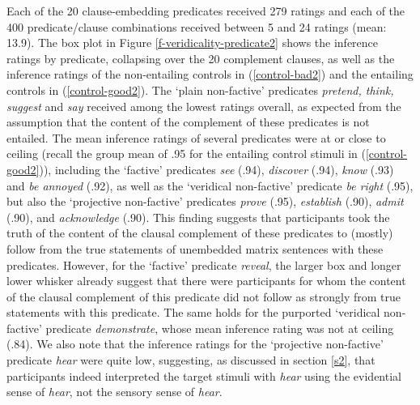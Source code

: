\documentclass[11pt,fleqn]{article}
\newcommand{\6}{\mbox{$[\hspace*{-.6mm}[$}}
\newcommand{\9}{\mbox{$]\hspace*{-.6mm}]$}}
\begin{document}
Each of the 20 clause-embedding predicates received 279 ratings and each of the 400 predicate/clause combinations received between 5 and 24 ratings (mean: 13.9). The box plot in Figure \ref{f-veridicality-predicate2} shows the inference ratings by predicate, collapsing over the 20 complement clauses, as well as the inference ratings of the non-entailing controls in (\ref{control-bad2}) and the entailing controls in (\ref{control-good2}). The `plain non-factive' predicates {\em pretend, think, suggest} and {\em say} received among the lowest ratings overall, as expected from the assumption that the content of the complement of these predicates is not entailed.  The mean inference ratings of several predicates were at or close to ceiling (recall the group mean of .95 for the entailing control stimuli in (\ref{control-good2})), including the `factive' predicates {\em see} (.94), {\em discover} (.94),  {\em know} (.93) and {\em be annoyed} (.92), as well as the `veridical non-factive' predicate {\em be right} (.95), but also the `projective non-factive' predicates {\em prove} (.95),  {\em establish} (.90), {\em admit} (.90), and {\em acknowledge} (.90). This finding suggests that participants took the truth of the content of the clausal complement of these predicates to (mostly) follow from the true statements of unembedded matrix sentences with these predicates. However, for the `factive' predicate {\em reveal}, the larger box and longer lower whisker already suggest that there were participants for whom the content of the clausal complement of this predicate did not follow as strongly from true statements with this predicate. The same holds for the purported `veridical non-factive' predicate {\em demonstrate}, whose mean inference rating was not at ceiling (.84). We also note that the inference ratings for the `projective non-factive' predicate {\em hear} were quite low, suggesting, as discussed in section \ref{s2}, that participants indeed interpreted the target stimuli with {\em hear} using the evidential sense of {\em hear}, not the sensory sense of {\em hear}. 

\end{document}
